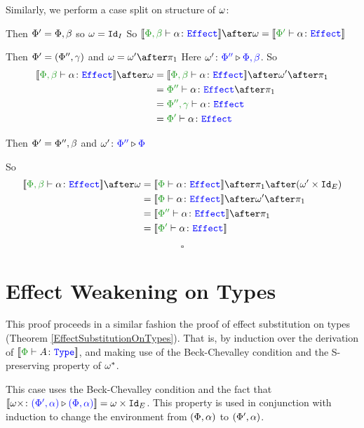         Similarly, we perform a case split on structure of $\omega$:
        
        \subcase{$\w=\i$}
        Then $\Phi' = \Phi,\beta$ so $\omega=\texttt{Id}_{I}$
        So $\deno{\typerelation{\P,\b}{\a}{\effect}}\after\w = \deno{\typerelation{\P'}{\a}{\effect}}$
        
        Then $\Phi' = (\Phi'',\gamma)$ and $\w=\w'\after\p$
        Here $\omega' \colon {\color{blue}\Phi''} \triangleright {\color {blue} \Phi,\beta}$.
        So
        \begin{align*}
            \deno{\typerelation{\P,\b}{\a}{\effect}}\after\w & = \deno{\typerelation{\P,\b}{\a}{\effect}}\after\w'\after\p\\
            & = {\typerelation{\P''}{\a}{\effect}}\after\p\\
            & = {\typerelation{\P'',\g}{\a}{\effect}}\\
            & = {\typerelation{\P'}{\a}{\effect}}\\
        \end{align*}
        
        Then $\Phi'=\Phi'',\beta$ and $\omega' \colon {\color{blue}\Phi''} \triangleright {\color {blue} \Phi}$
        
        So \begin{align*}
            \deno{\typerelation{\P,\b}{\a}{\effect}}\after\w &= \deno{\typerelation{\P}{\a}{\effect}}\after\p\after(\w'\times\Id{E})\\
            &=\deno{\typerelation{\P}{\a}{\effect}}\after\w'\after\p\\
            & = \deno{\typerelation{\P''}{\a}{\effect}}\after\p\\
            & = \deno{\typerelation{\P'}{\a}{\effect}}\\
        \end{align*}
    
        $$\square$$


\section{Effect Weakening on Types}\label{AppendixEffectWeakeningOnTypes}

This proof proceeds in a similar fashion the proof of effect substitution on types (Theorem \ref{EffectSubstitutionOnTypes}). That is, by induction over the derivation of $\deno{\typerelation{\P}{A}{\type}}$, and making use of the Beck-Chevalley condition and the S-preserving property of $\omega^*$. 

\case{\tquant}
    This case uses the Beck-Chevalley condition and the fact that ${\bf [\![}\omega\times \colon {\color{blue}(\Phi', \alpha)} \triangleright {\color {blue} (\Phi,\alpha)}{\bf ]\!]} = \omega\times \texttt{Id}_{E}$. This property is used in conjunction with induction to change the environment from $(\Phi, \alpha)$ to $(\Phi', \alpha)$.

